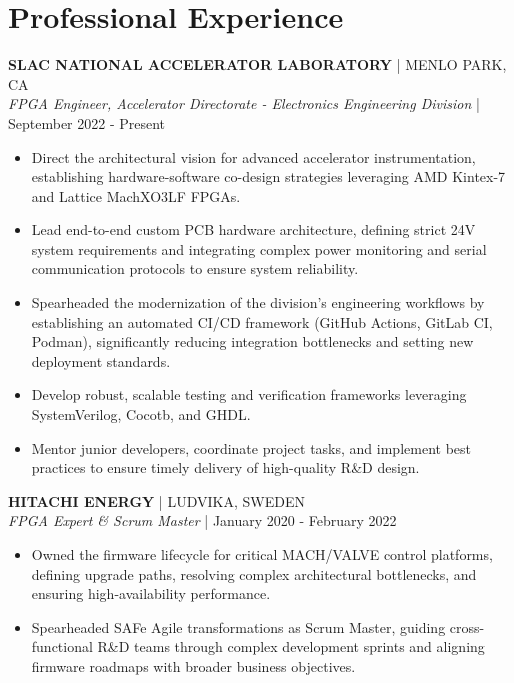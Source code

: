 \documentclass[10pt, letterpaper]{article}
\begin{document}
\section*{Professional Experience}

\noindent \textbf{SLAC NATIONAL ACCELERATOR LABORATORY} | MENLO PARK, CA\\
\textit{FPGA Engineer, Accelerator Directorate - Electronics Engineering Division} | September 2022 - Present
\begin{itemize}[leftmargin=*, nosep]
    \item Direct the architectural vision for advanced accelerator instrumentation, establishing hardware-software co-design strategies leveraging AMD Kintex-7 and Lattice MachXO3LF FPGAs.
    \item Lead end-to-end custom PCB hardware architecture, defining strict 24V system requirements and integrating complex power monitoring and serial communication protocols to ensure system reliability.
    \item Spearheaded the modernization of the division's engineering workflows by establishing an automated CI/CD framework (GitHub Actions, GitLab CI, Podman), significantly reducing integration bottlenecks and setting new deployment standards.
    \item Develop robust, scalable testing and verification frameworks leveraging SystemVerilog, Cocotb, and GHDL.
    \item Mentor junior developers, coordinate project tasks, and implement best practices to ensure timely delivery of high-quality R\&D design.
\end{itemize}

\vspace{6pt}
\noindent \textbf{HITACHI ENERGY} | LUDVIKA, SWEDEN\\
\textit{FPGA Expert \& Scrum Master} | January 2020 - February 2022
\begin{itemize}[leftmargin=*, nosep]
    \item Owned the firmware lifecycle for critical MACH/VALVE control platforms, defining upgrade paths, resolving complex architectural bottlenecks, and ensuring high-availability performance.
    \item Spearheaded SAFe Agile transformations as Scrum Master, guiding cross-functional R\&D teams through complex development sprints and aligning firmware roadmaps with broader business objectives.
\end{itemize}
\end{document}
